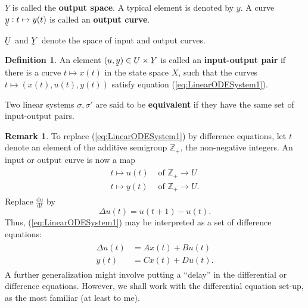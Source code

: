 \documentclass[12pt]{book}
\theoremstyle{plain}
\theoremstyle{definition}
\newtheorem{definition}{Definition}[section]
\newtheorem*{remark}{Remark}
\newcommand{\dd}[1]{\mathrm{d}#1}
\newcommand{\utilde}[1]{\underaccent{\tilde}{#1}}
\begin{document}
$Y$ is called the \textbf{output space}.
A typical element is denoted by $y$.
A curve $\utilde{y}: t \mapsto y(t)$ is called an \textbf{output curve}.

$\utilde{U}$ and $\utilde{Y}$ denote the space of input and output curves.

\begin{definition}
    An element $(\utilde{u}, \utilde{y}) \in \utilde{U} \times \utilde{Y}$ is called an \textbf{input-output pair} if there is a curve $t \mapsto x(t)$ in the state space $X$, such that the curves $t \mapsto (x(t), u(t), y(t))$ satisfy equation (\ref{eq:LinearODESystem1}).
\end{definition}

Two linear systems $\sigma, \sigma'$ are said to be \textbf{equivalent} if they have the same set of input-output pairs.

\begin{remark}
    To replace (\ref{eq:LinearODESystem1}) by difference equations, let $t$ denote an element of the additive semigroup $\mathbb{Z}_+$, the non-negative integers.
    An input or output curve is now a map
    \begin{align*}
    \begin{split}
        t \mapsto u(t) &\text{ of } \mathbb{Z}_+ \to U \\
        t \mapsto y(t) &\text{ of } \mathbb{Z}_+ \to U.
    \end{split}
    \end{align*}
    Replace $\frac{\dd{u}}{\dd{t}}$ by
    $$\Delta u(t) = u(t + 1) - u(t).$$
    Thus, (\ref{eq:LinearODESystem1}) may be interpreted as a set of difference equations:
    \begin{align*}
    \begin{split}
        \Delta u(t) &= Ax(t) + Bu(t) \\
        y(t) &= Cx(t) + Du(t).
    \end{split}
    \end{align*}
    A further generalization might involve putting a ``delay'' in the differential or difference equations.
    However, we shall work with the differential equation set-up, as the most familiar (at least to me).
\end{remark}
\end{document}
